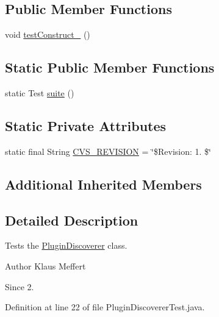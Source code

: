 \subsection*{Public Member Functions}
\begin{DoxyCompactItemize}
\item 
void \hyperlink{classorg_1_1jgap_1_1util_1_1_plugin_discoverer_test_a7c18c34fa61eea040b9d90bb21d8ada5}{test\-Construct\-\_} ()
\end{DoxyCompactItemize}
\subsection*{Static Public Member Functions}
\begin{DoxyCompactItemize}
\item 
static Test \hyperlink{classorg_1_1jgap_1_1util_1_1_plugin_discoverer_test_ab33c736cf0d4003b9ec395d2218b4cee}{suite} ()
\end{DoxyCompactItemize}
\subsection*{Static Private Attributes}
\begin{DoxyCompactItemize}
\item 
static final String \hyperlink{classorg_1_1jgap_1_1util_1_1_plugin_discoverer_test_a798837306ff13b45028dbbe2974e74b4}{C\-V\-S\-\_\-\-R\-E\-V\-I\-S\-I\-O\-N} = \char`\"{}\$Revision\-: 1. \$\char`\"{}
\end{DoxyCompactItemize}
\subsection*{Additional Inherited Members}


\subsection{Detailed Description}
Tests the \hyperlink{classorg_1_1jgap_1_1util_1_1_plugin_discoverer}{Plugin\-Discoverer} class.

\begin{DoxyAuthor}{Author}
Klaus Meffert 
\end{DoxyAuthor}
\begin{DoxySince}{Since}
2. 
\end{DoxySince}


Definition at line 22 of file Plugin\-Discoverer\-Test.\-java.



